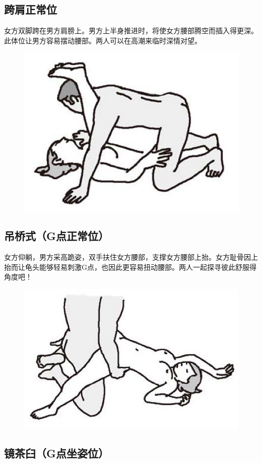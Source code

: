 \documentclass[12pt,UTF8]{ctexbook}
\begin{document}
\subsection{跨肩正常位}

女方双脚跨在男方肩膀上。男方上半身推进时，将使女方腰部腾空而插入得更深。此体位让男方容易摆动腰部。两人可以在高潮来临时深情对望。

\begin{figure}[htbp]
\centering
\includegraphics[width=0.7\linewidth]{tw25}
\caption{}
\label{fig:1}
\end{figure}

\subsection{吊桥式（G点正常位）}

女方仰躺，男方采高跪姿，双手扶住女方腰部，支撑女方腰部上抬。女方耻骨因上抬而让龟头能够轻易刺激G点，也因此更容易扭动腰部。两人一起探寻彼此舒服得角度吧！

\begin{figure}[htbp]
\centering
\includegraphics[width=0.7\linewidth]{tw26}
\caption{}
\label{fig:1}
\end{figure}

\subsection{镜茶臼（G点坐姿位）}
\end{document}
